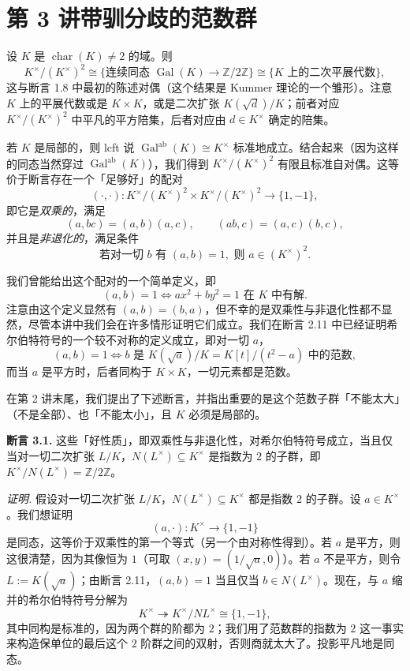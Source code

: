 
\section*{第 3 讲\quad 带驯分歧的范数群}

设 $K$ 是 $\operatorname{char}(K)\neq 2$ 的域。则
\[
  K^{\times}/(K^{\times})^2
  \cong\{\text{连续同态 } \operatorname{Gal}(K)\to\mathbb{Z}/2\mathbb{Z}\}
  \cong\{K \text{ 上的二次平展代数}\},
\]
这与断言 1.8 中最初的陈述对偶（这个结果是 Kummer 理论的一个雏形）。注意 $K$ 上的平展代数或是 $K\times K$，或是二次扩张 $K(\sqrt{d})/K$；前者对应 $K^{\times}/(K^{\times})^2$ 中平凡的平方陪集，后者对应由 $d\in K^{\times}$ 确定的陪集。

若 $K$ 是局部的，则 lcft 说 $\operatorname{Gal}^{\mathrm{ab}}(K)\cong\widehat{K^{\times}}$ 标准地成立。结合起来（因为这样的同态当然穿过 $\operatorname{Gal}^{\mathrm{ab}}(K)$），我们得到 $K^{\times}/(K^{\times})^2$ 有限且标准自对偶。这等价于断言存在一个「足够好」的配对
\[
  (\cdot,\cdot)\colon K^{\times}/(K^{\times})^2\times K^{\times}/(K^{\times})^2\to\{1,-1\},
\]
即它是\emph{双乘的}，满足
\[
  (a,bc)=(a,b)(a,c),\qquad (ab,c)=(a,c)(b,c),
\]
并且是\emph{非退化的}，满足条件
\[
  \text{若对一切 } b \text{ 有 } (a,b)=1,\text{ 则 } a\in(K^{\times})^2.
\]

我们曾能给出这个配对的一个简单定义，即
\[
  (a,b)=1 \iff ax^2+by^2=1 \text{ 在 } K \text{ 中有解}.
\]
注意由这个定义显然有 $(a,b)=(b,a)$，但不幸的是双乘性与非退化性都不显然，尽管本讲中我们会在许多情形证明它们成立。我们在断言 2.11 中已经证明希尔伯特符号的一个较不对称的定义成立，即对一切 $a$，
\[
  (a,b)=1 \iff b \text{ 是 } K(\sqrt{a})/K=K[t]/(t^2-a) \text{ 中的范数},
\]
而当 $a$ 是平方时，后者同构于 $K\times K$，一切元素都是范数。

在第 2 讲末尾，我们提出了下述断言，并指出重要的是这个范数子群「不能太大」（不是全部）、也「不能太小」，且 $K$ 必须是局部的。

\textbf{断言 3.1.} 这些「好性质」，即双乘性与非退化性，对希尔伯特符号成立，当且仅当对一切二次扩张 $L/K$，$N(L^{\times})\subseteq K^{\times}$ 是指数为 $2$ 的子群，即 $K^{\times}/N(L^{\times})=\mathbb{Z}/2\mathbb{Z}$。

\textit{证明.} 假设对一切二次扩张 $L/K$，$N(L^{\times})\subseteq K^{\times}$ 都是指数 $2$ 的子群。设 $a\in K^{\times}$。我们想证明
\begin{equation}\tag{3.1}
  (a,\cdot)\colon K^{\times}\to\{1,-1\}
\end{equation}
是同态，这等价于双乘性的第一个等式（另一个由对称性得到）。若 $a$ 是平方，则这很清楚，因为其像恒为 $1$（可取 $(x,y)=(1/\sqrt{a},0)$）。若 $a$ 不是平方，则令 $L:=K(\sqrt{a})$；由断言 2.11，$(a,b)=1$ 当且仅当 $b\in N(L^{\times})$。现在，与 $a$ 缩并的希尔伯特符号分解为
\[
  K^{\times}\twoheadrightarrow K^{\times}/NL^{\times}\cong\{1,-1\},
\]
其中同构是标准的，因为两个群的阶都为 $2$；我们用了范数群的指数为 $2$ 这一事实来构造保单位的最后这个 $2$ 阶群之间的双射，否则商就太大了。投影平凡地是同态。

